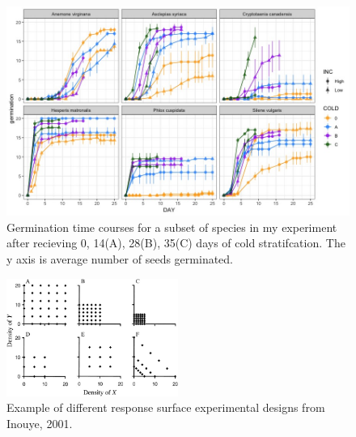 \documentclass[12pt]{article}\usepackage[]{graphicx}\usepackage[]{color}
\begin{document}
\begin{figure}[here]
\begin{center}
\includegraphics[width=\textwidth,keepaspectratio]{..//figures/Subset_time_couse.jpeg}
\caption{Germination time courses for a subset of species in my experiment after recieving 0, 14(A), 28(B), 35(C) days of cold stratifcation. The y axis is average number of seeds germinated.}
\label{fig:Figure 6}
\end{center}
\end{figure}


\begin{figure}[here]
\begin{center}
\includegraphics[width=0.5\textwidth]{..//figures/response_surface.jpg}
\caption{Example of different response surface experimental designs from Inouye, 2001.}
\label{fig:Figure 7}
\end{center}
\end{figure}

\end{document}
